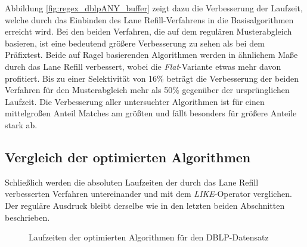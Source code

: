 Abbildung \ref{fig:regex_dblpANY_buffer} zeigt dazu die Verbesserung der Laufzeit, welche durch das Einbinden des Lane Refill-Verfahrens in die Basisalgorithmen erreicht wird.
Bei den beiden Verfahren, die auf dem regulären Musterabgleich basieren, ist eine bedeutend größere Verbesserung zu sehen	 als bei dem Präfixtest.
Beide auf Ragel basierenden Algorithmen werden in ähnlichem Maße durch das Lane Refill verbessert, wobei die \emph{Flat}-Variante etwas mehr davon profitiert.
Bis zu einer Selektivität von 16\% beträgt die Verbesserung der beiden Verfahren für den Musterabgleich mehr als 50\% gegenüber der ursprünglichen Laufzeit.
Die Verbesserung aller untersuchter Algorithmen ist für einen mittelgroßen Anteil Matches am größten und fällt besonders für größere Anteile stark ab.

\subsection{Vergleich der optimierten Algorithmen}
\label{sec:regex_evaluation_beobachtung_3}

Schließlich werden die absoluten Laufzeiten der durch das Lane Refill verbesserten Verfahren untereinander und mit dem \emph{LIKE}-Operator verglichen.
Der reguläre Ausdruck bleibt derselbe wie in den letzten beiden Abschnitten beschrieben.

\begin{figure}[ht]
	\centering
	\caption{Laufzeiten der optimierten Algorithmen für den DBLP-Datensatz}
	\label{fig:regex_dblpANY_optimal}
\end{figure}

